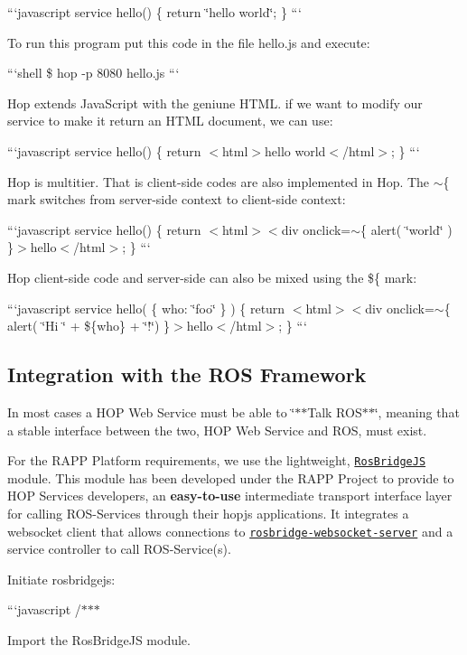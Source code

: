 ```javascript service hello() \{ return \char`\"{}hello world\char`\"{}; \} ```

To run this program put this code in the file hello.\-js and execute\-:

```shell \$ hop -\/p 8080 hello.\-js ```

Hop extends Java\-Script with the geniune H\-T\-M\-L. if we want to modify our service to make it return an H\-T\-M\-L document, we can use\-:

```javascript service hello() \{ return $<$html$>$hello world$<$/html$>$; \} ```

Hop is multitier. That is client-\/side codes are also implemented in Hop. The $\sim$\{ mark switches from server-\/side context to client-\/side context\-:

```javascript service hello() \{ return $<$html$>$$<$div onclick=$\sim$\{ alert( \char`\"{}world\char`\"{} ) \}$>$hello$<$/html$>$; \} ```

Hop client-\/side code and server-\/side can also be mixed using the \$\{ mark\-:

```javascript service hello( \{ who\-: \char`\"{}foo\char`\"{} \} ) \{ return $<$html$>$$<$div onclick=$\sim$\{ alert( \char`\"{}\-Hi \char`\"{} + \$\{who\} + \char`\"{}!\char`\"{}) \}$>$hello$<$/html$>$; \} ```

\subsection*{Integration with the R\-O\-S Framework}

In most cases a H\-O\-P Web Service must be able to \char`\"{}$\ast$$\ast$\-Talk R\-O\-S$\ast$$\ast$\char`\"{}, meaning that a stable interface between the two, H\-O\-P Web Service and R\-O\-S, must exist.

For the R\-A\-P\-P Platform requirements, we use the lightweight, \href{https://github.com/klpanagi/RosBridgeJS}{\tt Ros\-Bridge\-J\-S} module. This module has been developed under the R\-A\-P\-P Project to provide to H\-O\-P Services developers, an {\bfseries easy-\/to-\/use} intermediate transport interface layer for calling R\-O\-S-\/\-Services through their hopjs applications. It integrates a websocket client that allows connections to \href{http://wiki.ros.org/rosbridge_server}{\tt rosbridge-\/websocket-\/server} and a service controller to call R\-O\-S-\/\-Service(s).

Initiate rosbridgejs\-:

```javascript /$\ast$$\ast$$\ast$
\begin{DoxyItemize}
\item Import the Ros\-Bridge\-J\-S module.
\end{DoxyItemize}

